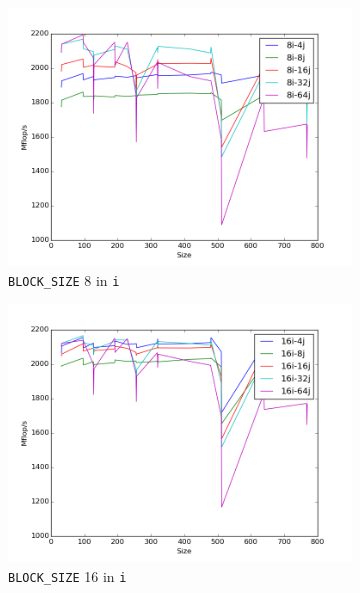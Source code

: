 \documentclass[10pt]{article}
\begin{document}
\begin{figure}[H]
        \centering
        \begin{subfigure}[b]{0.35\textwidth}
                \centering
                \includegraphics[width=\textwidth]{figures/8i-64j.png}
                \caption{{\tt BLOCK\_SIZE} 8 in {\tt i}}
        \end{subfigure}%
        \begin{subfigure}[b]{0.35\textwidth}
                \centering
                \includegraphics[width=\textwidth]{figures/16i-64j.png}
                \caption{{\tt BLOCK\_SIZE} 16 in {\tt i}}
        \end{subfigure}%
        \begin{subfigure}[b]{0.35\textwidth}

\end{subfigure}
\end{figure}
\end{document}
